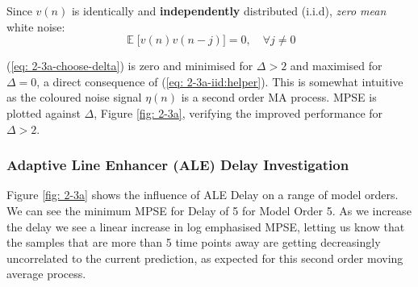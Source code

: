 \documentclass[12pt]{article}
\numberwithin{equation}{section}
\DeclareMathOperator*{\E}{\mathbb{E}}
\begin{document}
		\noindent
		Since $v(n)$ is identically and \textbf{independently} distributed (i.i.d), \textit{zero mean} white noise:
		\begin{equation}
		\E \bigg[ v(n) v(n - j) \bigg] = 0, \quad \forall j \neq 0
		\label{eq: 2-3a-iid:helper}
		\end{equation}
		
		(\ref{eq: 2-3a-choose-delta}) is zero and minimised for $\Delta > 2$ and maximised for $\Delta = 0$, a direct consequence of (\ref{eq: 2-3a-iid:helper}).
		This is somewhat intuitive as the coloured noise signal $\eta(n)$ is a second order MA process. \newline
		\noindent
		MPSE is plotted against $\Delta$, Figure \ref{fig: 2-3a}, verifying the improved performance for $\Delta > 2$.
		
		\subsubsection{Adaptive Line Enhancer (ALE) Delay Investigation}
		\begin{minipage}[b]{0.49\textwidth}
				Figure \ref{fig: 2-3a} shows the influence of ALE Delay on a range of model orders. We can see the minimum MPSE for Delay of 5 for Model Order 5. As we increase the delay we see a linear increase in log emphasised MPSE, letting us know that the samples that are more than 5 time points away are getting decreasingly uncorrelated to the current prediction, as expected for this second order moving average process.
		\end{minipage}%
		\begin{minipage}{0.04\textwidth}
			\hspace*{0.04\textwidth}
		\end{minipage}%
\end{document}

